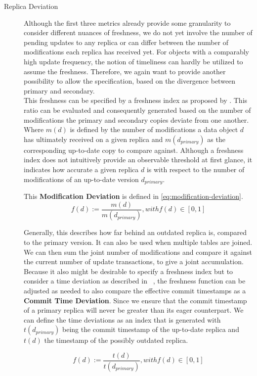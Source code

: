 \begin{description}
    \item [Replica Deviation] Although the first three metrics already provide some granularity to consider different nuances of freshness, we 
        do not yet involve the number of pending updates to any replica or can differ between the number of modifications each replica has received yet.
        For objects with a comparably high update frequency, the notion of timeliness can hardly be utilized to assume the freshness.
        Therefore, we again want to provide another possibility to allow the specification, based on the divergence between primary and secondary.\\
        This freshness can be specified by a freshness index as proposed by \cite{rohm:2002}.
        This ratio can be evaluated and consequently generated based on the number of modifications the primary and 
        secondary copies deviate from one another. Where $m(d)$ is defined by the number of modifications a data object $d$ has ultimately received on a given replica
        and $m(d_{primary})$ as the corresponding up-to-date copy to compare against. 
        Although a freshness index does not intuitively provide an observable threshold at first glance, it indicates how accurate a 
        given replica $d$ is with respect to the number of modifications of an up-to-date version $d_{primary}$.

        This \textbf{Modification Deviation} is defined in \ref{eq:modification-deviation}.
        \begin{equation} \label{eq:modification-deviation}
            f(d) := \frac{m(d)}{m(d_{primary})},  with f(d) \in [0,1]
        \end{equation}
        
        Generally, this describes how far behind an outdated replica is, compared to the primary version.
        It can also be used when multiple tables are joined.
        We can then sum the joint number of modifications and compare it against the current number of update transactions, to give a joint accumulation.\\

        Because it also might be desirable to specify a freshness index but to consider a time deviation as described in ~\cite{voicu:2010,hennemann_sw_2021},
        the freshness function can be adjusted as needed to also compare the effective commit timestamps as a \textbf{Commit Time Deviation}.
        Since we ensure that the commit timestamp of a primary replica will never be greater than its eager counterpart. We can define the time deviations as an index that is 
        generated with $t(d_{primary})$ being the commit timestamp of the up-to-date replica and $t(d)$ the timestamp of the possibly outdated replica.


        \begin{equation}
            f(d) := \frac{t(d)}{t(d_{primary})},  with f(d) \in [0,1]
        \end{equation}

\end{description}

